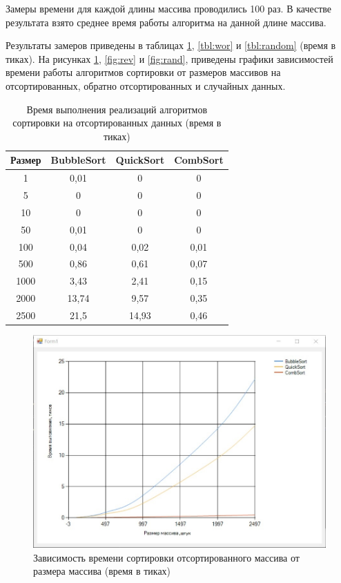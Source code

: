Замеры времени для каждой длины массива проводились 100 раз. В качестве результата взято среднее время работы алгоритма на данной длине массива.

Результаты замеров приведены в таблицах \ref{tbl:best}, \ref{tbl:wor} и \ref{tbl:random} (время в тиках).
На рисунках \ref{fig:str}, \ref{fig:rev} и \ref{fig:rand}, приведены графики зависимостей времени работы алгоритмов сортировки от размеров массивов на отсортированных, обратно отсортированных и случайных данных.


\captionsetup{justification=raggedright, singlelinecheck=false}

\begin{table}[h]
	\begin{center}
		\caption{Время выполнения реализаций алгоритмов сортировки на отсортированных данных (время в тиках)}
		\label{tbl:best}
		\begin{tabular}{|c|c|c|c|}
			\hline
			 Размер & BubbleSort &  QuickSort &  CombSort \\
			\hline
			1&	0,01&	0&	0 \\
			\hline
			5&	0&	0&	0 \\
			\hline
			10&	0&	0&	0\\
			\hline
			50&	0,01&	0&	0\\
			\hline
			100&	0,04&	0,02&	0,01\\
			\hline
			500	&0,86&	0,61&	0,07\\
			\hline
			1000&	3,43&	2,41&	0,15\\
			\hline
			2000&	13,74&	9,57&	0,35\\
			\hline
			2500&	21,5&	14,93&	0,46\\
			\hline
		\end{tabular}
	\end{center}
	
\end{table}


\captionsetup{justification=centering, singlelinecheck=false}

\begin{figure}[H]
	\centering
	\includegraphics[width=0.7\linewidth]{inc/img/str}
	\caption{Зависимость времени сортировки отсортированного массива от размера массива (время в тиках)}
	\label{fig:str}
\end{figure}

